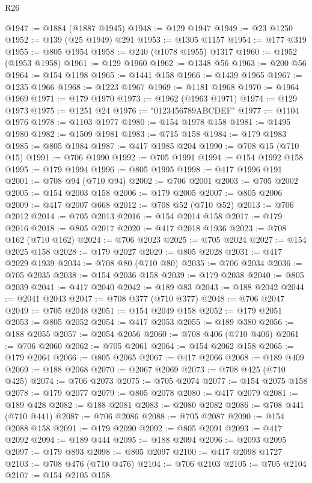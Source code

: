 \begin{lexlean}{R26}
\begin{coremodule}
@1947 := @1884 (@1887 @1945)
@1948 := @129 @1947
@1949 := @23 @1250
@1952 := @139 (@25 @1949) @291
@1953 := @1305 @1157
@1954 := @177 @319
@1955 := @805 @1954
@1958 := @240 (@1078 @1955) @1317
@1960 := @1952 (@1953 @1958)
@1961 := @129 @1960
@1962 := @1348 @56
@1963 := @200 @56
@1964 := @154 @1198
@1965 := @1441 @158
@1966 := @1439 @1965
@1967 := @1235 @1966
@1968 := @1223 @1967
@1969 := @1181 @1968
@1970 := @1964 @1969
@1971 := @179 @1970
@1973 := @1962 (@1963 @1971)
@1974 := @129 @1973
@1975 := @1251 @24
@1976 := "0123456789ABCDEF"
@1977 := @1104 @1976
@1978 := @1103 @1977
@1980 := @154 @1978 @158
@1981 := @1495 @1980
@1982 := @1509 @1981
@1983 := @715 @158
@1984 := @179 @1983
@1985 := @805 @1984
@1987 := @417 @1985 @204
@1990 := @708 @15 (@710 @15)
@1991 := @706 @1990
@1992 := @705 @1991
@1994 := @154 @1992 @158
@1995 := @179 @1994
@1996 := @805 @1995
@1998 := @417 @1996 @191
@2001 := @708 @94 (@710 @94)
@2002 := @706 @2001
@2003 := @705 @2002
@2005 := @154 @2003 @158
@2006 := @179 @2005
@2007 := @805 @2006
@2009 := @417 @2007 @668
@2012 := @708 @52 (@710 @52)
@2013 := @706 @2012
@2014 := @705 @2013
@2016 := @154 @2014 @158
@2017 := @179 @2016
@2018 := @805 @2017
@2020 := @417 @2018 @1936
@2023 := @708 @162 (@710 @162)
@2024 := @706 @2023
@2025 := @705 @2024
@2027 := @154 @2025 @158
@2028 := @179 @2027
@2029 := @805 @2028
@2031 := @417 @2029 @1939
@2034 := @708 @80 (@710 @80)
@2035 := @706 @2034
@2036 := @705 @2035
@2038 := @154 @2036 @158
@2039 := @179 @2038
@2040 := @805 @2039
@2041 := @417 @2040
@2042 := @189 @83
@2043 := @188 @2042
@2044 := @2041 @2043
@2047 := @708 @377 (@710 @377)
@2048 := @706 @2047
@2049 := @705 @2048
@2051 := @154 @2049 @158
@2052 := @179 @2051
@2053 := @805 @2052
@2054 := @417 @2053
@2055 := @189 @380
@2056 := @188 @2055
@2057 := @2054 @2056
@2060 := @708 @406 (@710 @406)
@2061 := @706 @2060
@2062 := @705 @2061
@2064 := @154 @2062 @158
@2065 := @179 @2064
@2066 := @805 @2065
@2067 := @417 @2066
@2068 := @189 @409
@2069 := @188 @2068
@2070 := @2067 @2069
@2073 := @708 @425 (@710 @425)
@2074 := @706 @2073
@2075 := @705 @2074
@2077 := @154 @2075 @158
@2078 := @179 @2077
@2079 := @805 @2078
@2080 := @417 @2079
@2081 := @189 @428
@2082 := @188 @2081
@2083 := @2080 @2082
@2086 := @708 @441 (@710 @441)
@2087 := @706 @2086
@2088 := @705 @2087
@2090 := @154 @2088 @158
@2091 := @179 @2090
@2092 := @805 @2091
@2093 := @417 @2092
@2094 := @189 @444
@2095 := @188 @2094
@2096 := @2093 @2095
@2097 := @179 @893
@2098 := @805 @2097
@2100 := @417 @2098 @1727
@2103 := @708 @476 (@710 @476)
@2104 := @706 @2103
@2105 := @705 @2104
@2107 := @154 @2105 @158

\end{coremodule}
\end{lexlean}
